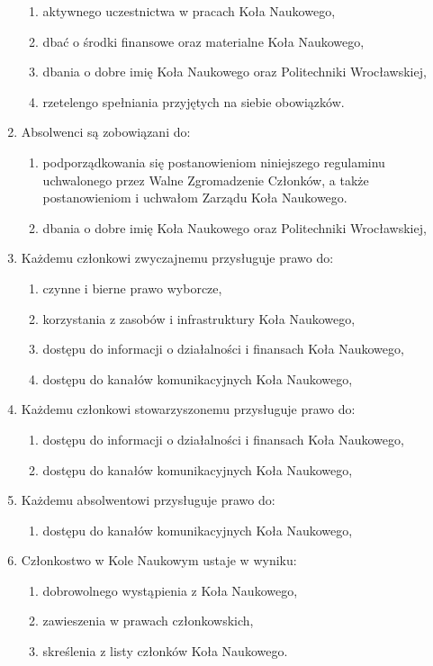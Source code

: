 \documentclass[12pt,a4paper]{article}
\begin{document}
\begin{enumerate}
\begin{enumerate}
            \item aktywnego uczestnictwa w pracach Koła Naukowego,
            \item dbać o środki finansowe oraz materialne Koła Naukowego,
            \item dbania o dobre imię Koła Naukowego oraz Politechniki Wrocławskiej,
            \item rzetelengo spełniania przyjętych na siebie obowiązków.
        \end{enumerate}
    \item Absolwenci są zobowiązani do:
        \begin{enumerate}
            \item podporządkowania się postanowieniom niniejszego regulaminu uchwalonego przez Walne Zgromadzenie Członków, a także postanowieniom i uchwałom Zarządu Koła Naukowego.
            \item dbania o dobre imię Koła Naukowego oraz Politechniki Wrocławskiej,
        \end{enumerate}
    \item Każdemu członkowi zwyczajnemu przysługuje prawo do:
        \begin{enumerate}
            \item czynne i bierne prawo wyborcze,
            \item korzystania z zasobów i infrastruktury Koła Naukowego,
            \item dostępu do informacji o działalności i finansach Koła Naukowego,
            \item dostępu do kanałów komunikacyjnych Koła Naukowego,
        \end{enumerate}
    \item Każdemu członkowi stowarzyszonemu przysługuje prawo do:
        \begin{enumerate}
            \item dostępu do informacji o działalności i finansach Koła Naukowego,
            \item dostępu do kanałów komunikacyjnych Koła Naukowego,
        \end{enumerate}
    \item Każdemu absolwentowi przysługuje prawo do:
        \begin{enumerate}
            \item dostępu do kanałów komunikacyjnych Koła Naukowego,
        \end{enumerate}
    \item Członkostwo w Kole Naukowym ustaje w wyniku:
        \begin{enumerate}
            \item dobrowolnego wystąpienia z Koła Naukowego,
            \item zawieszenia w prawach członkowskich,
            \item skreślenia z listy członków Koła Naukowego.
        \end{enumerate}


\end{enumerate}
\end{document}
